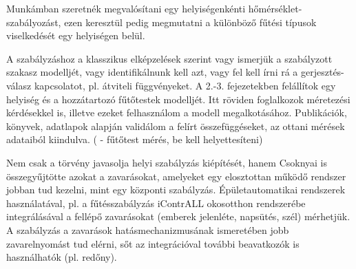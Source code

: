


Munkámban szeretnék megvalósítani egy helyiségenkénti hőmérséklet-szabályozást, ezen keresztül pedig megmutatni a különböző fűtési típusok viselkedését egy helyiségen belül.
\vspace{18pt}

\pagebreak

A szabályzáshoz a klasszikus elképzelések szerint vagy ismerjük a szabályzott szakasz modelljét, vagy identifikálnunk kell azt, vagy fel kell írni rá a gerjesztés-válasz kapcsolatot, pl. átviteli függvényeket. 
%
A 2.-3. fejezetekben felállítok egy helyiség és a hozzátartozó fűtőtestek modelljét. Itt röviden foglalkozok méretezési kérdésekkel is, illetve ezeket felhasználom a modell megalkotásához. Publikációk, könyvek, adatlapok alapján validálom a felírt összefüggéseket, az ottani mérések adataiból kiindulva. (\cite[313, 361.~o.]{Herz} - fűtőtest mérés, be kell helyettesíteni)


Nem csak a törvény javasolja helyi szabályzás kiépítését, hanem Csoknyai \cite[118.~o.]{Herz} is összegyűjtötte azokat a zavarásokat, amelyeket egy elosztottan működő rendszer jobban tud kezelni, mint egy központi szabályzás. Épületautomatikai rendszerek használatával, pl. a fűtésszabályzás iContrALL okosotthon rendszerébe integrálásával a fellépő zavarásokat (emberek jelenléte, napsütés, szél) mérhetjük. A szabályzás a zavarások hatásmechanizmusának ismeretében jobb zavarelnyomást tud elérni, sőt az integrációval további beavatkozók is használhatók (pl. redőny). %

